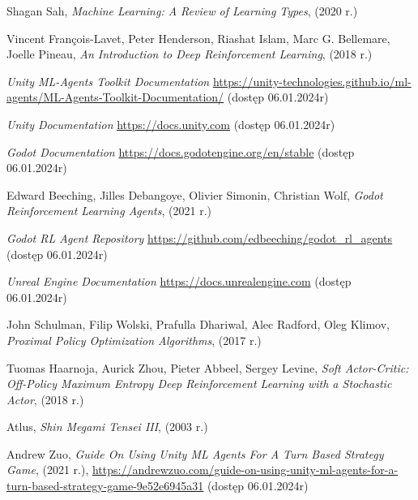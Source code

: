 \documentclass{SGGW-thesis}
\begin{document}
\begin{thebibliography}{9}
  Shagan Sah,
  \textit{Machine Learning: A Review of Learning Types},
  (2020 r.)

  Vincent François-Lavet, Peter Henderson, Riashat Islam, Marc G. Bellemare, Joelle Pineau,
  \textit{An Introduction to Deep Reinforcement Learning},
  (2018 r.)

  \textit{Unity ML-Agents Toolkit Documentation} 
  \url{https://unity-technologies.github.io/ml-agents/ML-Agents-Toolkit-Documentation/}
  (dostęp 06.01.2024r)

  \textit{Unity Documentation}
  \url{https://docs.unity.com}
  (dostęp 06.01.2024r)

  \textit{Godot Documentation}
  \url{https://docs.godotengine.org/en/stable}
  (dostęp 06.01.2024r)

  Edward Beeching, Jilles Debangoye, Olivier Simonin, Christian Wolf,
  \textit{Godot Reinforcement Learning Agents},
  (2021 r.)

  \textit{Godot RL Agent Repository}
  \url{https://github.com/edbeeching/godot_rl_agents}
  (dostęp 06.01.2024r)

  \textit{Unreal Engine Documentation}
  \url{https://docs.unrealengine.com}
  (dostęp 06.01.2024r)
  
  John Schulman, Filip Wolski, Prafulla Dhariwal, Alec Radford, Oleg Klimov, 
  \textit{Proximal Policy Optimization Algorithms},
  (2017 r.)

  Tuomas Haarnoja, Aurick Zhou, Pieter Abbeel, Sergey Levine, 
  \textit{Soft Actor-Critic: Off-Policy Maximum Entropy Deep Reinforcement Learning with a Stochastic Actor},
  (2018 r.)

  Atlus,
  \textit{Shin Megami Tensei III},
  (2003 r.)

  Andrew Zuo,
  \textit{Guide On Using Unity ML Agents For A Turn Based Strategy Game},
  (2021 r.),
  \url{https://andrewzuo.com/guide-on-using-unity-ml-agents-for-a-turn-based-strategy-game-9e52e6945a31} 
  (dostęp 06.01.2024r)
\end{thebibliography}

\beforelastpage
\end{document}
